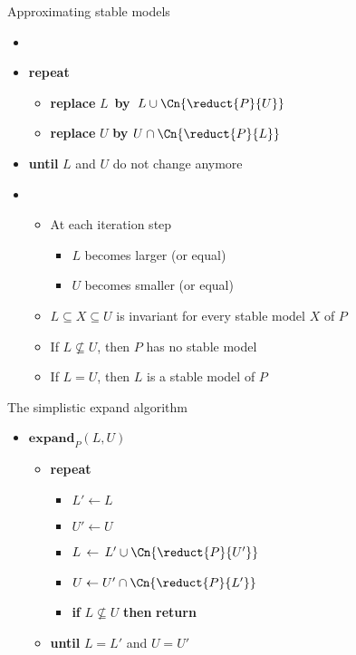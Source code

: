 \begin{frame}{Approximating stable models}
  \begin{itemize}
  \item {} \
    \smallskip
  \item []\textbf{repeat}
    \begin{itemize}\normalsize
    \item[] \textbf{replace} $L$\, \textbf{by}\, $L\cup\Cn{\reduct{P}{U}}$
    \item[] \textbf{replace} $U$   \textbf{by}   $U\cap\Cn{\reduct{P}{L}}$
    \end{itemize}
  \item [] \textbf{until} $L$ and $U$ do not change anymore
    \smallskip
  \item<2->  \
    \begin{itemize}\normalsize
    \item At each iteration step
      \begin{itemize}\normalsize
      \item $L$ becomes larger  (or equal)
      \item $U$ becomes smaller (or equal)
      \end{itemize}
    \item $L\subseteq X\subseteq U$ is invariant for every stable model $X$ of $P$
      \medskip
    \item<3-> If $L\not\subseteq U$, then $P$ has no stable model
    \item<4-> If $L=U$, then $L$ is a stable model of $P$
    \end{itemize}
  \end{itemize}
\end{frame}
\begin{frame}{The simplistic expand algorithm}
  \bigskip
  \begin{itemize}
  \item[] $\mathbf{expand}_{P}(L,U)$ \
    \begin{itemize}\normalsize
    \item[] \textbf{repeat} \
      \begin{itemize}\normalsize
      \item [] $L'\leftarrow L$
      \item [] $U'\leftarrow U$
        \smallskip
      \item [] $L\,\leftarrow\,L'\cup\Cn{\reduct{P}{U'}}$
      \item [] $U  \leftarrow  U'\cap\Cn{\reduct{P}{L'}}$
        \smallskip
      \item [] \textbf{if} $L\not\subseteq U$ \textbf{then} \textbf{return}
        \smallskip
      \end{itemize}
    \item[]\textbf{until} $L=L'$ and $U=U'$
    \end{itemize}
  \end{itemize}
\end{frame}
